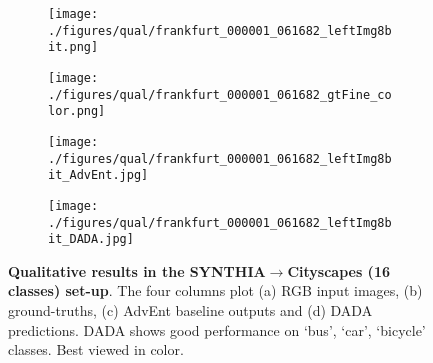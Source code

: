 \documentclass[10pt,twocolumn,letterpaper]{article}
\begin{document}
\begin{figure*}[t!]
\begin{center}
		\hdashrule[1ex][x]{17cm}{1.5pt}{1.5mm}\vspace{-0.13cm}
		\begin{subfigure}[t]{0.24\textwidth}\centering
			\texttt{[image: ./figures/qual/frankfurt\_000001\_061682\_leftImg8bit.png]}
		\end{subfigure}
		\begin{subfigure}[t]{0.24\textwidth}\centering
			\texttt{[image: ./figures/qual/frankfurt\_000001\_061682\_gtFine\_color.png]}
		\end{subfigure}
		\begin{subfigure}[t]{0.24\textwidth}\centering
			\texttt{[image: ./figures/qual/frankfurt\_000001\_061682\_leftImg8bit\_AdvEnt.jpg]}
		\end{subfigure}
		\begin{subfigure}[t]{0.24\textwidth}\centering
			\texttt{[image: ./figures/qual/frankfurt\_000001\_061682\_leftImg8bit\_DADA.jpg]}
		\end{subfigure}
	\end{center}
	\vspace{-0.3cm}
	\caption{\small \textbf{Qualitative results in the SYNTHIA$\rightarrow$Cityscapes (16 classes) set-up}. The four columns plot (a) RGB input images, (b) ground-truths, (c) AdvEnt baseline outputs and (d) DADA predictions. DADA shows good performance on `bus', `car', `bicycle' classes. Best viewed in color.}
	\vspace{-0.2cm}
	\label{fig:sup_qual_seg_1}
\end{figure*}
\end{document}

